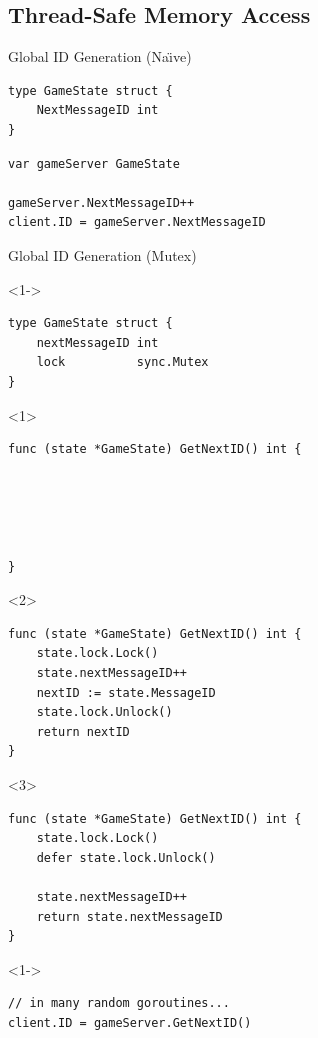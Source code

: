\documentclass[pdf]{beamer}
\begin{document}
\subsection{Thread-Safe Memory Access}
\begin{frame}[fragile]{Global ID Generation (Na\"\i ve)}
\begin{lstlisting}
type GameState struct {
    NextMessageID int
}
\end{lstlisting}
\pause
\begin{lstlisting}
var gameServer GameState

gameServer.NextMessageID++
client.ID = gameServer.NextMessageID
\end{lstlisting}
\end{frame}

\begin{frame}[fragile]{Global ID Generation (Mutex)}
\begin{onlyenv}<1->
\begin{lstlisting}
type GameState struct {
    nextMessageID int
    lock          sync.Mutex
}
\end{lstlisting}
\end{onlyenv}
\begin{onlyenv}<1>
\begin{lstlisting}
func (state *GameState) GetNextID() int {





}
\end{lstlisting}
\end{onlyenv}
\begin{onlyenv}<2>
\begin{lstlisting}
func (state *GameState) GetNextID() int {
    state.lock.Lock()
    state.nextMessageID++
    nextID := state.MessageID
    state.lock.Unlock()
    return nextID
}
\end{lstlisting}
\end{onlyenv}
\begin{onlyenv}<3>
\begin{lstlisting}
func (state *GameState) GetNextID() int {
    state.lock.Lock()
    defer state.lock.Unlock()

    state.nextMessageID++
    return state.nextMessageID
}
\end{lstlisting}
\end{onlyenv}
\begin{onlyenv}<1->
\begin{lstlisting}
// in many random goroutines...
client.ID = gameServer.GetNextID()
\end{lstlisting}
\end{onlyenv}
\end{frame}
\end{document}
